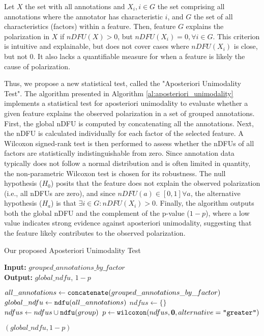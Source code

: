 Let $X$ the set with all annotations and $X_i, i \in G$ the set comprising all annotations where the annotator has characteristic $i$, and $G$ the set of all characteristics (factors) within a feature. Then, feature $G$ explains the polarization in $X$ if $nDFU(X) > 0$, but $nDFU(X_i) = 0, \forall i \in G$. This criterion is intuitive and explainable, but does not cover cases where $nDFU(X_i)$ is close, but not 0. It also lacks a quantifiable measure for when a feature is likely the cause of polarization. 

Thus, we propose a new statistical test, called the "Aposteriori Unimodality Test". The algorithm presented in Algorithm \ref{al:aposteriori_unimodality} implements a statistical test for aposteriori unimodality to evaluate whether a given feature explains the observed polarization in a set of grouped annotations. First, the global \ac{nDFU} is computed by concatenating all the annotations. Next, the \ac{nDFU} is calculated individually for each factor of the selected feature. A Wilcoxon signed-rank test is then performed to assess whether the \acp{nDFU} of all factors are statistically indistinguishable from zero. Since annotation data typically does not follow a normal distribution and is often limited in quantity, the non-parametric Wilcoxon test is chosen for its robustness. The null hypothesis ($H_0$) posits that the feature does not explain the observed polarization (i.e., all \acp{nDFU} are zero), and since $nDFU(a) \in [0,1] \forall a$, the alternative hypothesis ($H_a$) is that $\exists i \in G: nDFU(X_i) > 0$. Finally, the algorithm outputs both the global \ac{nDFU} and the complement of the p-value ($1 - p$), where a low value indicates strong evidence against aposteriori unimodality, suggesting that the feature likely contributes to the observed polarization.

\begin{algorithm}
	\caption{Our proposed Aposteriori Unimodality Test}
	\label{al:aposteriori_unimodality}
	\hspace*{\algorithmicindent} \textbf{Input:} $grouped\_annotations\_by\_factor$  \\
	\hspace*{\algorithmicindent} \textbf{Output:} $global\_ndfu$, $1 - p$ 
	\begin{algorithmic}[1]
		\State $all\_annotations \gets \texttt{concatenate}(grouped\_annotations\_by\_factor)$ 
		\State $global\_ndfu \gets \texttt{ndfu}(all\_annotations)$ 
		\State
		\State $ndfus \gets \{\}$
		\State $ndfus \gets  ndfus \cup \texttt{ndfu}(group)$ 
		\EndFor
		\State
		\State $p \gets \texttt{wilcoxon}(ndfus, \mathbf{0}, alternative=\texttt{"greater"})$
		
		\State \Return $(global\_ndfu, 1 - p)$
	\end{algorithmic}
\end{algorithm}

